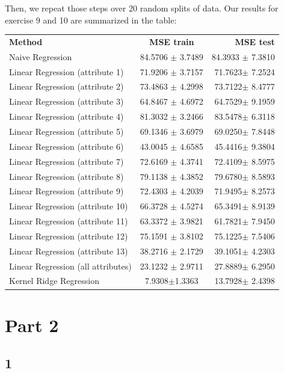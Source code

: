 \documentclass{article} %
\begin{document}
Then, we repeat those steps over 20 random splits of data. Our results for exercise 9 and 10 are summarized in the table:
\begin{center}
\begin{tabular}{|  l c r|}
  \hline
  \textbf{Method} & \textbf{MSE train} & \textbf{MSE test} \\
  Naive Regression & 84.5706 $ \pm $ 3.7489 & 84.3933 $ \pm $ 7.3810\\
 Linear Regression (attribute 1) & 71.9206 $ \pm $ 3.7157& 71.7623$ \pm $ 7.2524\\
  Linear Regression (attribute 2) & 73.4863 $ \pm $ 4.2998& 73.7122$ \pm $ 8.4777\\
 Linear Regression (attribute 3) & 64.8467 $ \pm $ 4.6972& 64.7529$ \pm $ 9.1959\\
 Linear Regression (attribute 4) & 81.3032 $ \pm $ 3.2466& 83.5478$ \pm $ 6.3118 \\
 Linear Regression (attribute 5) & 69.1346 $ \pm $ 3.6979& 69.0250$ \pm $ 7.8448\\
 Linear Regression (attribute 6) & 43.0045 $ \pm $ 4.6585& 45.4416$ \pm $ 9.3804\\
 Linear Regression (attribute 7) & 72.6169 $ \pm $ 4.3741& 72.4109$ \pm $ 8.5975\\
 Linear Regression (attribute 8) & 79.1138 $ \pm $ 4.3852& 79.6780$ \pm $ 8.5893\\
 Linear Regression (attribute 9) & 72.4303 $ \pm $ 4.2039& 71.9495$ \pm $ 8.2573\\
 Linear Regression (attribute 10) & 66.3728 $ \pm $ 4.5274& 65.3491$ \pm $ 8.9139\\
 Linear Regression (attribute 11) & 63.3372 $ \pm $ 3.9821& 61.7821$ \pm $ 7.9450\\
 Linear Regression (attribute 12) & 75.1591 $ \pm $ 3.8102& 75.1225$ \pm $ 7.5406\\
  Linear Regression (attribute 13) & 38.2716 $ \pm $ 2.1729& 39.1051$ \pm $ 4.2303\\
  Linear Regression (all attributes) & 23.1232 $ \pm $ 2.9711& 27.8889$ \pm $ 6.2950\\
 Kernel Ridge Regression  & 7.9308$ \pm $1.3363 & 13.7928$ \pm$ 2.4398\\
  \hline
\end{tabular}
\end{center}

\section*{Part 2}
\subsection*{1}
\end{document}
